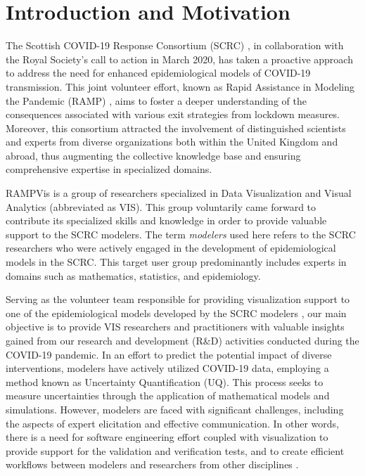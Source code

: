 \section{Introduction and Motivation}
\label{sec:intro}

The Scottish COVID-19 Response Consortium (SCRC) \cite{2020University}, in collaboration with the Royal Society's call to action in March 2020, has taken a proactive approach to address the need for enhanced epidemiological models of COVID-19 transmission.
This joint volunteer effort, known as Rapid Assistance in Modeling the Pandemic (RAMP) \cite{2020Rapid}, aims to foster a deeper understanding of the consequences associated with various exit strategies from lockdown measures.
Moreover, this consortium attracted the involvement of distinguished scientists and experts from diverse organizations both within the United Kingdom and abroad, thus augmenting the collective knowledge base and ensuring comprehensive expertise in specialized domains.

RAMPVis \cite{2020Visualization} is a group of researchers specialized in Data Visualization and Visual Analytics (abbreviated as VIS).
This group voluntarily came forward to contribute its specialized skills and knowledge in order to provide valuable support to the SCRC modelers.
The term \textit{modelers} used here refers to the SCRC researchers who were actively engaged in the development of epidemiological models in the SCRC.
This target user group predominantly includes experts in domains such as mathematics, statistics, and epidemiology.

Serving as the volunteer team responsible for providing visualization support to one of the epidemiological models developed by the SCRC modelers \cite{chen2022RAMPVIS}, our main objective is to provide VIS researchers and practitioners with valuable insights gained from our research and development (R\&D) activities conducted during the COVID-19 pandemic.
In an effort to predict the potential impact of diverse interventions, modelers have actively utilized COVID-19 data, employing a method known as Uncertainty Quantification (UQ).
This process seeks to measure uncertainties through the application of mathematical models and simulations.
However, modelers are faced with significant challenges, including the aspects of expert elicitation and effective communication.
In other words, there is a need for software engineering effort coupled with visualization to provide support for the validation and verification tests, and to create efficient workflows between modelers and researchers from other disciplines \cite{ackland2022Royal}.

